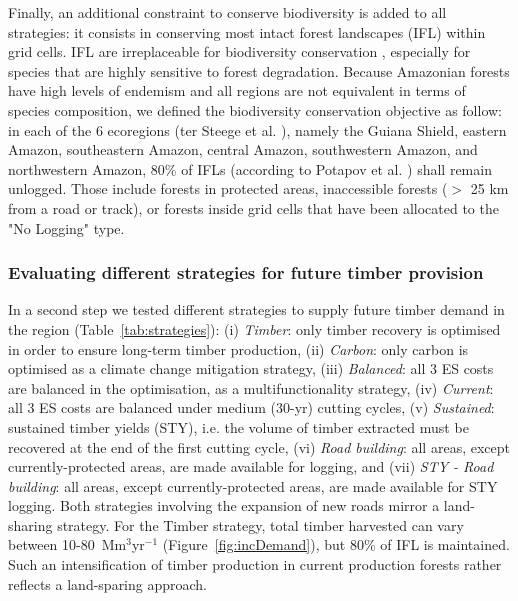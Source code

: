 \documentclass{article}
\begin{document}
Finally, an additional constraint  to conserve biodiversity is added to all strategies: it consists in conserving most intact forest landscapes (IFL) within grid cells. IFL are irreplaceable for biodiversity conservation \cite{Gibson2011}, especially for species that are highly sensitive to forest degradation. Because Amazonian forests have high levels of endemism and all regions are not equivalent in terms of species composition, we defined the biodiversity conservation objective as follow: in each of the 6 ecoregions (ter Steege et al. \cite{TerSteege2013}), namely the Guiana Shield, eastern Amazon, southeastern Amazon, central Amazon, southwestern Amazon, and northwestern Amazon, 80\% of IFLs (according to Potapov et al. \cite{Potapov2017}) shall remain unlogged. Those include forests in protected areas, inaccessible forests ($>$ 25 km from a road or track), or forests inside grid cells that have been allocated to the "No Logging" type. 



\subsubsection{Evaluating different strategies for future timber provision}
\label{sec:strategies}

In a second step we tested different strategies to supply future timber demand in the region (Table~\ref{tab:strategies}): (i) \textit{Timber}: only timber recovery is optimised in order to ensure long-term timber production, (ii) \textit{Carbon}: only carbon is optimised as a climate change mitigation strategy, (iii) \textit{Balanced}: all 3 ES costs are balanced in the optimisation, as a multifunctionality strategy, (iv) \textit{Current}: all 3 ES costs are balanced under medium (30-yr) cutting cycles, (v) \textit{Sustained}: sustained timber yields (STY), i.e. the volume of timber extracted must be recovered at the end of the first cutting cycle, (vi) \textit{Road building}: all areas, except currently-protected areas, are made available for logging, and (vii) \textit{STY - Road building}: all areas, except currently-protected areas, are made available for STY logging. Both strategies involving the expansion of new roads mirror a land-sharing strategy. For the Timber strategy, total timber harvested can vary between 10-80~Mm$^3$yr$^{-1}$ (Figure~\ref{fig:incDemand}), but 80\% of IFL is maintained. Such an intensification of timber production in current production forests rather reflects a land-sparing approach.
\end{document}
